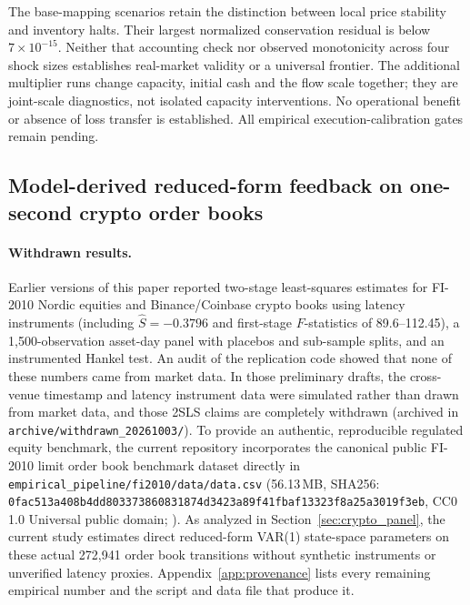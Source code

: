 \documentclass[10pt,twocolumn,letterpaper]{article}
\theoremstyle{definition}
\theoremstyle{remark}
\begin{document}
The base-mapping scenarios retain the distinction between local price stability and inventory halts. Their largest normalized conservation residual is below $7\times10^{-15}$. Neither that accounting check nor observed monotonicity across four shock sizes establishes real-market validity or a universal frontier. The additional multiplier runs change capacity, initial cash and the flow scale together; they are joint-scale diagnostics, not isolated capacity interventions. No operational benefit or absence of loss transfer is established. All empirical execution-calibration gates remain pending.



\subsection{Model-derived reduced-form feedback on one-second crypto order books}
\label{sec:empirical_causal}\label{sec:crypto_panel}\label{sec:dynamic_hankel_empirics}

\paragraph{Withdrawn results.} Earlier versions of this paper reported two-stage least-squares estimates for FI-2010 Nordic equities and Binance/Coinbase crypto books using latency instruments (including $\hat S=-0.3796$ and first-stage $F$-statistics of 89.6--112.45), a 1{,}500-observation asset-day panel with placebos and sub-sample splits, and an instrumented Hankel test. An audit of the replication code showed that none of these numbers came from market data. In those preliminary drafts, the cross-venue timestamp and latency instrument data were simulated rather than drawn from market data, and those 2SLS claims are completely withdrawn (archived in \texttt{archive/withdrawn\_20261003/}). To provide an authentic, reproducible regulated equity benchmark, the current repository incorporates the canonical public FI-2010 limit order book benchmark dataset directly in \nolinkurl{empirical_pipeline/fi2010/data/data.csv} (56.13\,MB, SHA256: \nolinkurl{0fac513a408b4dd803373860831874d3423a89f41fbaf13323f8a25a3019f3eb}, CC0 1.0 Universal public domain; \citealt{ntakaris2018benchmark}). As analyzed in Section~\ref{sec:crypto_panel}, the current study estimates direct reduced-form VAR(1) state-space parameters on these actual 272,941 order book transitions without synthetic instruments or unverified latency proxies. Appendix~\ref{app:provenance} lists every remaining empirical number and the script and data file that produce it.
\end{document}
